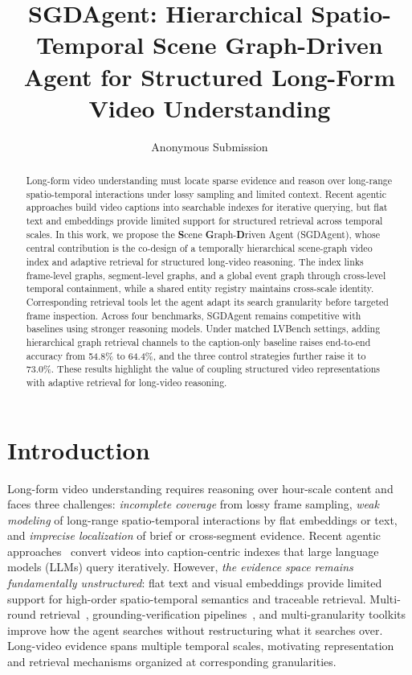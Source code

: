\documentclass[11pt]{article}
\title{SGDAgent: Hierarchical Spatio-Temporal Scene Graph-Driven Agent for Structured Long-Form Video Understanding}
\author{Anonymous Submission}
\begin{document}
\maketitle

\begin{abstract}
Long-form video understanding must locate sparse evidence and reason over long-range spatio-temporal interactions under lossy sampling and limited context.
Recent agentic approaches build video captions into searchable indexes for iterative querying, but flat text and embeddings provide limited support for structured retrieval across temporal scales.
In this work, we propose the \textbf{S}cene \textbf{G}raph-\textbf{D}riven Agent (SGDAgent), whose central contribution is the co-design of a temporally hierarchical scene-graph video index and adaptive retrieval for structured long-video reasoning.
The index links frame-level graphs, segment-level graphs, and a global event graph through cross-level temporal containment, while a shared entity registry maintains cross-scale identity.
Corresponding retrieval tools let the agent adapt its search granularity before targeted frame inspection.
Across four benchmarks, SGDAgent remains competitive with baselines using stronger reasoning models.
Under matched LVBench settings, adding hierarchical graph retrieval channels to the caption-only baseline raises end-to-end accuracy from 54.8\% to 64.4\%, and the three control strategies further raise it to 73.0\%.
These results highlight the value of coupling structured video representations with adaptive retrieval for long-video reasoning.
\end{abstract}


\section{Introduction}
\label{sec:intro}



Long-form video understanding requires reasoning over hour-scale content and faces three challenges: \emph{incomplete coverage} from lossy frame sampling, \emph{weak modeling} of long-range spatio-temporal interactions by flat embeddings or text, and \emph{imprecise localization} of brief or cross-segment evidence.
Recent agentic approaches~\cite{deepvideo2025,videoagent,drvideo2025} convert videos into caption-centric indexes that large language models (LLMs) query iteratively.
However, \emph{the evidence space remains fundamentally unstructured}: flat text and visual embeddings provide limited support for high-order spatio-temporal semantics and traceable retrieval.
Multi-round retrieval~\cite{videoagent}, grounding-verification pipelines~\cite{videomind}, and multi-granularity toolkits~\cite{videoseek} improve how the agent searches without restructuring what it searches over.
Long-video evidence spans multiple temporal scales, motivating representation and retrieval mechanisms organized at corresponding granularities.
\end{document}
